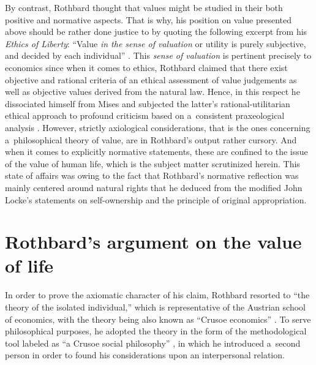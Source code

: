 By contrast, Rothbard thought that values might be studied in their both positive and normative aspects. That is why, his position on value presented above should be rather done justice to by quoting the following excerpt from his \textit{Ethics of Liberty}: ``Value \textit{in the sense of valuation} or utility is purely subjective, and decided by each individual'' 
\parencite[][italics added]{}. %
 This \textit{sense of valuation} is pertinent precisely to economics since when it comes to ethics, Rothbard 
\parencites*[][p.78]{}[][p.12]{} %
 claimed that there exist objective and rational criteria of an ethical assessment of value judgements as well as objective values derived from the natural law. Hence, in this respect he dissociated himself from Mises and subjected the latter's rational-utilitarian ethical approach to profound criticism based on a~consistent praxeological analysis 
\parencites[see][pp.90–99]{}[][pp.201–214]{}. %
 However, strictly axiological considerations, that is the ones concerning a~philosophical theory of value, are in Rothbard's output rather cursory. And when it comes to explicitly normative statements, these are confined to the issue of the value of human life, which is the subject matter scrutinized herein. This state of affairs was owing to the fact that Rothbard's normative reflection was mainly centered around natural rights that he deduced from the modified John Locke's statements on self-ownership and the principle of original appropriation.



\section{Rothbard's argument on the value of life}

In order to prove the axiomatic character of his claim, Rothbard 
\parencites*[][p.946]{}[see also 2009, ch. 1-2,][]{} %
 resorted to ``the theory of the isolated individual,'' which is representative of the Austrian school of economics, with the theory being also known as ``Crusoe economics'' 
\parencite[see][pp.353–392]{}. %
 To serve philosophical purposes, he adopted the theory in the form of the methodological tool labeled as ``a Crusoe social philosophy'' 
\parencite[see][pp.29–34]{}, %
 in which he introduced a~second person in order to found his considerations upon an interpersonal relation.



